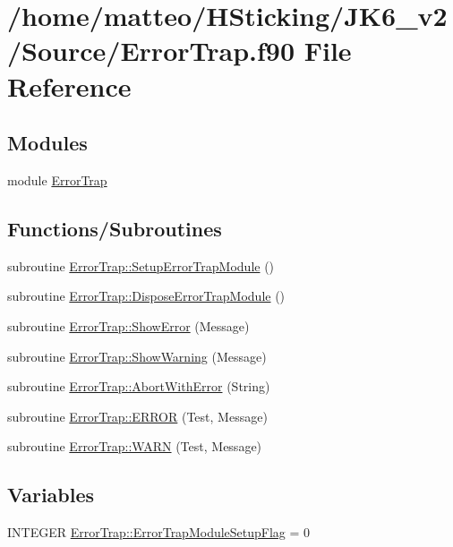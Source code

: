 \hypertarget{_error_trap_8f90}{
\section{/home/matteo/HSticking/JK6\_\-v2/Source/ErrorTrap.f90 File Reference}
\label{_error_trap_8f90}
}
\subsection*{Modules}
\begin{DoxyCompactItemize}
\item 
module \hyperlink{namespace_error_trap}{ErrorTrap}
\end{DoxyCompactItemize}
\subsection*{Functions/Subroutines}
\begin{DoxyCompactItemize}
\item 
subroutine \hyperlink{namespace_error_trap_a611b4303bac6ac22cc75d77d1ddd7182}{ErrorTrap::SetupErrorTrapModule} ()
\item 
subroutine \hyperlink{namespace_error_trap_a3f6ccae3b4a825f702ab38fd75114d67}{ErrorTrap::DisposeErrorTrapModule} ()
\item 
subroutine \hyperlink{namespace_error_trap_a692b52f918df54cd99082da25793d646}{ErrorTrap::ShowError} (Message)
\item 
subroutine \hyperlink{namespace_error_trap_ace2fdc9fc500ac4dffaf0a06e053b6a0}{ErrorTrap::ShowWarning} (Message)
\item 
subroutine \hyperlink{namespace_error_trap_ae80447005fe2502fdd96646cd1510389}{ErrorTrap::AbortWithError} (String)
\item 
subroutine \hyperlink{namespace_error_trap_ac61176418131d4f6becefa8914209aa6}{ErrorTrap::ERROR} (Test, Message)
\item 
subroutine \hyperlink{namespace_error_trap_a333255057ba2633db5a01b25ec3aa18e}{ErrorTrap::WARN} (Test, Message)
\end{DoxyCompactItemize}
\subsection*{Variables}
\begin{DoxyCompactItemize}
\item 
INTEGER \hyperlink{namespace_error_trap_ab0af30c4946661d94501e25bd1b61d17}{ErrorTrap::ErrorTrapModuleSetupFlag} = 0
\end{DoxyCompactItemize}
